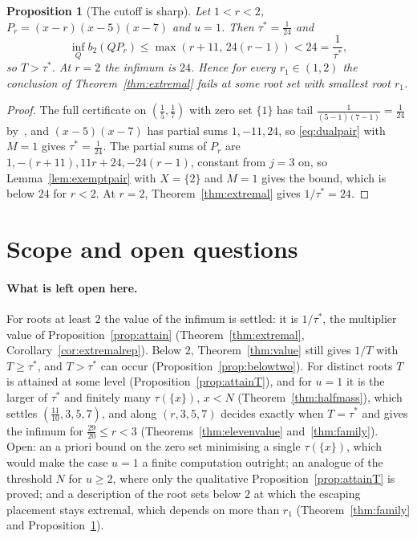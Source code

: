 \documentclass[11pt]{article}
\newtheorem{proposition}[theorem]{Proposition}
\theoremstyle{definition}
\theoremstyle{plain}
\begin{document}
\begin{proposition}[The cutoff is sharp]\label{prop:cutoffsharp}
Let $1<r<2$, $P_r=(x-r)(x-5)(x-7)$ and $u=1$.  Then $\tau^*=\tfrac1{24}$
and
\[
  \inf_Qb_2(QP_r)\le\max(r+11,\,24(r-1))<24=\frac1{\tau^*},
\]
so $T>\tau^*$.  At $r=2$ the infimum is $24$.  Hence for every
$r_1\in(1,2)$ the conclusion of Theorem~\ref{thm:extremal} fails at some
root set with smallest root $r_1$.
\end{proposition}

\begin{proof}
The full certificate on $(\tfrac15,\tfrac17)$ with zero set $\{1\}$ has
tail $\tfrac1{(5-1)(7-1)}=\tfrac1{24}$ by~\cite[Lemma~2.1]{coefficient-mass}, and $(x-5)(x-7)$ has
partial sums $1,-11,24$, so \eqref{eq:dualpair} with $M=1$ gives
$\tau^*=\tfrac1{24}$.  The partial sums of $P_r$ are
$1,-(r+11),11r+24,-24(r-1)$, constant from $j=3$ on, so
Lemma~\ref{lem:exemptpair} with $X=\{2\}$ and $M=1$ gives the bound, which
is below $24$ for $r<2$.  At $r=2$, Theorem~\ref{thm:extremal} gives
$1/\tau^*=24$.
\end{proof}

\section{Scope and open questions}\label{sec:scope}

\paragraph{What is left open here.}  For roots at least $2$ the value of
the infimum is settled: it is $1/\tau^*$, the multiplier value of
Proposition~\ref{prop:attain} (Theorem~\ref{thm:extremal},
Corollary~\ref{cor:extremalrep}).  Below $2$, Theorem~\ref{thm:value} still
gives $1/T$ with $T\ge\tau^*$, and $T>\tau^*$ can occur
(Proposition~\ref{prop:belowtwo}).  For distinct roots $T$ is attained at
some level (Proposition~\ref{prop:attainT}), and for $u=1$ it is the larger of
$\tau^*$ and finitely many $\tau(\{x\})$, $x<N$ (Theorem~\ref{thm:halfmass}),
which settles $(\tfrac{11}{10},3,5,7)$, and along $(r,3,5,7)$ decides
exactly when $T=\tau^*$ and gives the infimum for $\tfrac{29}{20}\le r<3$
(Theorems~\ref{thm:elevenvalue} and~\ref{thm:family}).  Open: an a priori
bound on the zero set minimising a single $\tau(\{x\})$, which would make
the case $u=1$ a finite computation outright; an analogue of the threshold
$N$ for $u\ge2$, where only the qualitative Proposition~\ref{prop:attainT}
is proved; and a description of the root sets below $2$ at which the
escaping placement stays extremal, which depends on more than $r_1$
(Theorem~\ref{thm:family} and Proposition~\ref{prop:cutoffsharp}).
\end{document}
